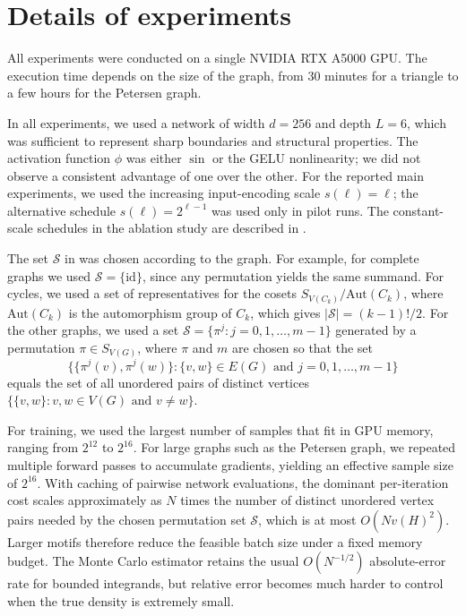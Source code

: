 \documentclass{article}
\theoremstyle{plain}
\theoremstyle{definition}
\theoremstyle{remark}
\begin{document}
\section{Details of experiments} \label{sec:experimentdetails}

All experiments were conducted on a single NVIDIA RTX A5000 GPU.
The execution time depends on the size of the graph, from 30 minutes for a triangle to a few hours for the Petersen graph.

In all experiments, we used a network of width $d=256$ and depth $L=6$, which was sufficient to represent sharp boundaries and structural properties.
The activation function $\phi$ was either $\sin$ or the GELU nonlinearity; we did not observe a consistent advantage of one over the other.
For the reported main experiments, we used the increasing input-encoding scale $s(\ell)=\ell$; the alternative schedule $s(\ell)=2^{\ell-1}$ was used only in pilot runs. The constant-scale schedules in the ablation study are described in .

The set $\mathcal{S}$ in  was chosen according to the graph. For example, for complete graphs we used $\mathcal{S}=\{\mathrm{id}\}$, since any permutation yields the same summand.
For cycles, we used a set of representatives for the cosets $S_{V(C_k)} / \text{Aut}(C_k)$, where $\text{Aut}(C_k)$ is the automorphism group of $C_k$, which gives $|\mathcal{S}| = (k-1)! / 2$.
For the other graphs, we used a set $\mathcal{S}=\{\pi^j : j = 0, 1, \ldots, m-1\}$ generated by a permutation $\pi \in S_{V(G)}$, where $\pi$ and $m$ are chosen so that the set
\[
  \{\{\pi^j(v), \pi^j(w)\} : \{v, w\} \in E(G) \text{ and } j = 0, 1, \ldots, m-1\}
\]
equals the set of all unordered pairs of distinct vertices $\{\{v, w\} : v, w \in V(G) \text{ and } v \neq w\}$.

For training, we used the largest number of samples that fit in GPU memory, ranging from $2^{12}$ to $2^{16}$.
For large graphs such as the Petersen graph, we repeated multiple forward passes to accumulate gradients, yielding an effective sample size of $2^{16}$.
With caching of pairwise network evaluations, the dominant per-iteration cost scales approximately as $N$ times the number of distinct unordered vertex pairs needed by the chosen permutation set $\mathcal{S}$, which is at most $O(Nv(H)^2)$. Larger motifs therefore reduce the feasible batch size under a fixed memory budget. The Monte Carlo estimator retains the usual $O(N^{-1/2})$ absolute-error rate for bounded integrands, but relative error becomes much harder to control when the true density is extremely small.
\end{document}
